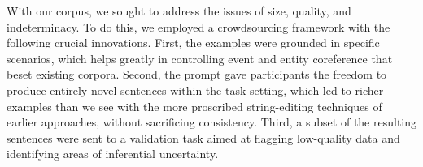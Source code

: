 With our corpus, we sought to address the issues of size, quality, and
indeterminacy. To do this, we employed a crowdsourcing framework with
the following crucial innovations. First, the examples were grounded
in specific scenarios, which helps greatly in controlling event and
entity coreference that beset existing corpora. Second, the prompt
gave participants the freedom to produce entirely novel sentences
within the task setting, which led to richer examples than we see with
the more proscribed string-editing techniques of earlier approaches,
without sacrificing consistency. Third, a subset of the resulting
sentences were sent to a validation task aimed at flagging low-quality
data and identifying areas of inferential uncertainty.







